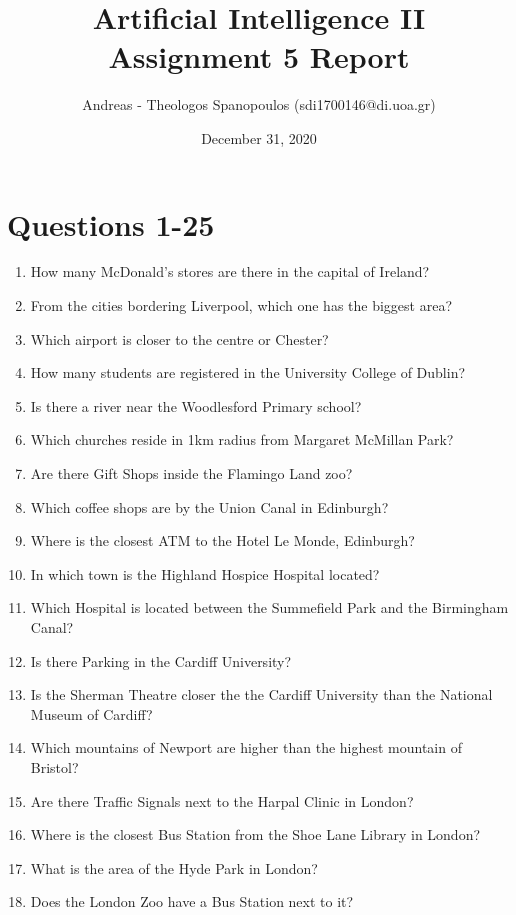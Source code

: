 \documentclass[12pt]{report}
\title{Artificial Intelligence II \\ Assignment 5 Report}
\author{Andreas - Theologos Spanopoulos (sdi1700146@di.uoa.gr)}
\date{December 31, 2020}
\begin{document}
\maketitle

\section*{Questions 1-25}
\begin{enumerate}
    \bigskip
    \item How many McDonald's stores are there in the capital of Ireland?
    \item From the cities bordering Liverpool, which one has the biggest area?
    \item Which airport is closer to the centre or Chester?
    \item How many students are registered in the University College of Dublin?
    \item Is there a river near the Woodlesford Primary school?
    \item Which churches reside in 1km radius from Margaret McMillan Park?
    \item Are there Gift Shops inside the Flamingo Land zoo?
    \item Which coffee shops are by the Union Canal in Edinburgh?
    \item Where is the closest ATM to the Hotel Le Monde, Edinburgh?
    \item In which town is the Highland Hospice Hospital located?
    \item Which Hospital is located between the Summefield Park and the Birmingham Canal?
    \item Is there Parking in the Cardiff University?
    \item Is the Sherman Theatre closer the the Cardiff University than the National Museum of Cardiff?
    \item Which mountains of Newport are higher than the highest mountain of Bristol?
    \item Are there Traffic Signals next to the Harpal Clinic in London?
    \item Where is the closest Bus Station from the Shoe Lane Library in London?
    \item What is the area of the Hyde Park in London?
    \item Does the London Zoo have a Bus Station next to it?

\end{enumerate}
\end{document}
